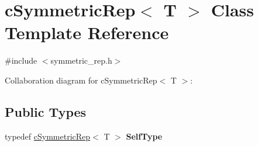 \hypertarget{classcSymmetricRep}{\section{c\-Symmetric\-Rep$<$ T $>$ Class Template Reference}
\label{classcSymmetricRep}
}


{\ttfamily \#include $<$symmetric\-\_\-rep.\-h$>$}



Collaboration diagram for c\-Symmetric\-Rep$<$ T $>$\-:
\subsection*{Public Types}
\begin{DoxyCompactItemize}
\item 
\hypertarget{classcSymmetricRep_abb21d3323b4e2133ec7bbc4f2d45d968}{typedef \hyperlink{classcSymmetricRep}{c\-Symmetric\-Rep}$<$ T $>$ {\bfseries Self\-Type}}\label{classcSymmetricRep_abb21d3323b4e2133ec7bbc4f2d45d968}

\end{DoxyCompactItemize}
